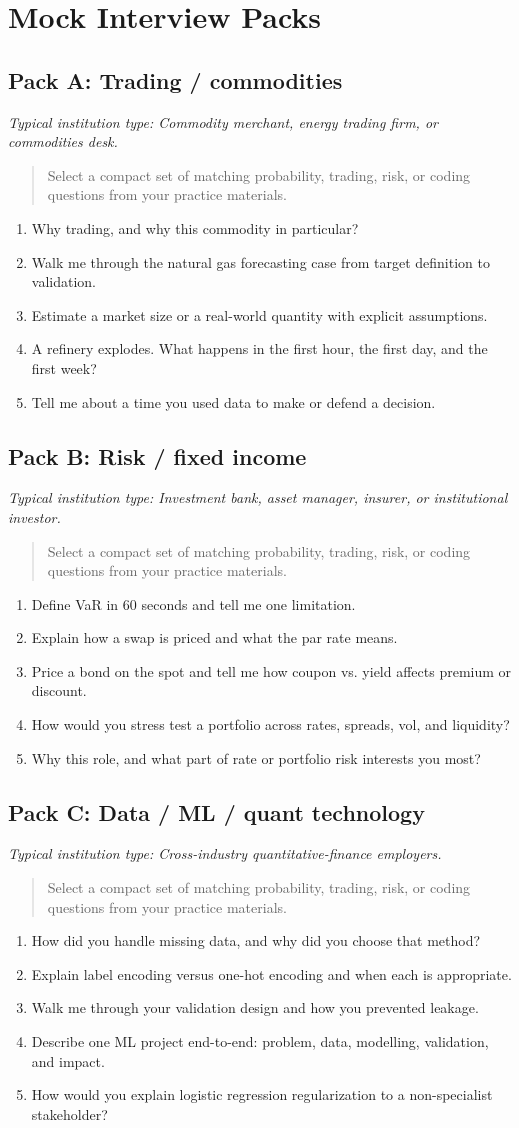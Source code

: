 \documentclass[11pt,letterpaper,openany]{book}
\newcommand{\RoleProfile}[2]{%
  \subsection{#1}%
  \noindent\textit{Typical institution type: #2.}\par
}
\newcommand{\playbooknote}[1]{\begin{quote}\small #1\end{quote}}
\begin{document}
\section{Mock Interview Packs}
\RoleProfile{Pack A: Trading / commodities}{Commodity merchant, energy trading firm, or commodities desk}
\playbooknote{Select a compact set of matching probability, trading, risk, or coding questions from your practice materials.}
\begin{enumerate}
  \item Why trading, and why this commodity in particular?
  \item Walk me through the natural gas forecasting case from target definition to validation.
  \item Estimate a market size or a real-world quantity with explicit assumptions.
  \item A refinery explodes. What happens in the first hour, the first day, and the first week?
  \item Tell me about a time you used data to make or defend a decision.
\end{enumerate}

\RoleProfile{Pack B: Risk / fixed income}{Investment bank, asset manager, insurer, or institutional investor}
\playbooknote{Select a compact set of matching probability, trading, risk, or coding questions from your practice materials.}
\begin{enumerate}
  \item Define VaR in 60 seconds and tell me one limitation.
  \item Explain how a swap is priced and what the par rate means.
  \item Price a bond on the spot and tell me how coupon vs. yield affects premium or discount.
  \item How would you stress test a portfolio across rates, spreads, vol, and liquidity?
  \item Why this role, and what part of rate or portfolio risk interests you most?
\end{enumerate}

\RoleProfile{Pack C: Data / ML / quant technology}{Cross-industry quantitative-finance employers}
\playbooknote{Select a compact set of matching probability, trading, risk, or coding questions from your practice materials.}
\begin{enumerate}
  \item How did you handle missing data, and why did you choose that method?
  \item Explain label encoding versus one-hot encoding and when each is appropriate.
  \item Walk me through your validation design and how you prevented leakage.
  \item Describe one ML project end-to-end: problem, data, modelling, validation, and impact.
  \item How would you explain logistic regression regularization to a non-specialist stakeholder?
\end{enumerate}
\end{document}
